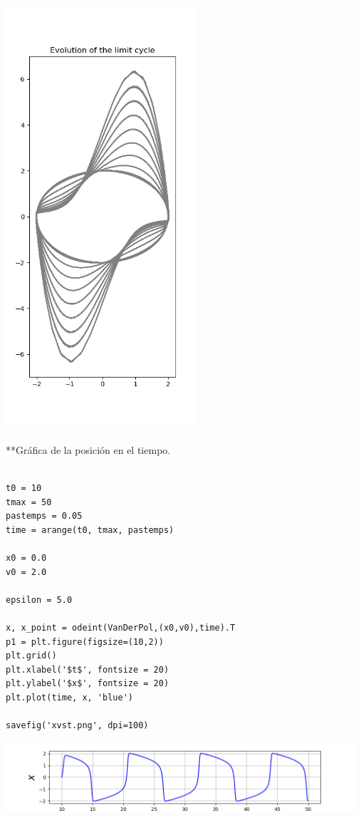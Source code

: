 \documentclass{article} %
\begin{document}
\begin{center}
	\includegraphics[width=7cm]{limitcycle.png}
\end{center}


**Gráfica de la posición en el tiempo.

\begin{verbatim} 

t0 = 10
tmax = 50
pastemps = 0.05
time = arange(t0, tmax, pastemps)

x0 = 0.0
v0 = 2.0

epsilon = 5.0

x, x_point = odeint(VanDerPol,(x0,v0),time).T
p1 = plt.figure(figsize=(10,2))
plt.grid()
plt.xlabel('$t$', fontsize = 20)
plt.ylabel('$x$', fontsize = 20)
plt.plot(time, x, 'blue')

savefig('xvst.png', dpi=100)

\end{verbatim}


\begin{center}
	\includegraphics[width=13cm]{xvst.png}
\end{center}
\end{document}
